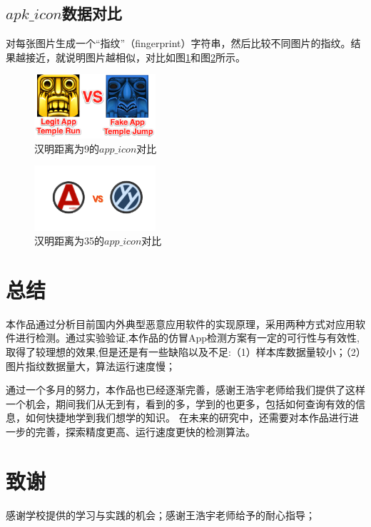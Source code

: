\documentclass[UTF8,a4paper,10pt, twocolumn]{ctexart}
\begin{document}
\subsection{$apk\_icon$数据对比}
对每张图片生成一个“指纹”（fingerprint）字符串，然后比较不同图片的指纹。结果越接近，就说明图片越相似，对比如图\ref{figure:zju9}和图\ref{figure:zju10}所示。

\begin{figure}[htbp]
  \centering
  \includegraphics[width=0.4\textwidth]{img/fig11.png}
  \caption{汉明距离为9的$app\_icon$对比}
  \label{figure:zju9}
  \end{figure}

\begin{figure}[htbp]
  \centering
  \includegraphics[width=0.4\textwidth]{img/fig12.png}
  \caption{汉明距离为35的$app\_icon$对比}
  \label{figure:zju10}
  \end{figure}

\section{总结}
本作品通过分析目前国内外典型恶意应用软件的实现原理，采用两种方式对应用软件进行检测。通过实验验证,本作品的仿冒App检测方案有一定的可行性与有效性,取得了较理想的效果,但是还是有一些缺陷以及不足:（1）样本库数据量较小；（2）图片指纹数据量大，算法运行速度慢；

通过一个多月的努力，本作品也已经逐渐完善，感谢王浩宇老师给我们提供了这样一个机会，期间我们从无到有，看到的多，学到的也更多，包括如何查询有效的信息，如何快捷地学到我们想学的知识。
在未来的研究中，还需要对本作品进行进一步的完善，探索精度更高、运行速度更快的检测算法。

\section{致谢}
感谢学校提供的学习与实践的机会；感谢王浩宇老师给予的耐心指导；
\end{document}
